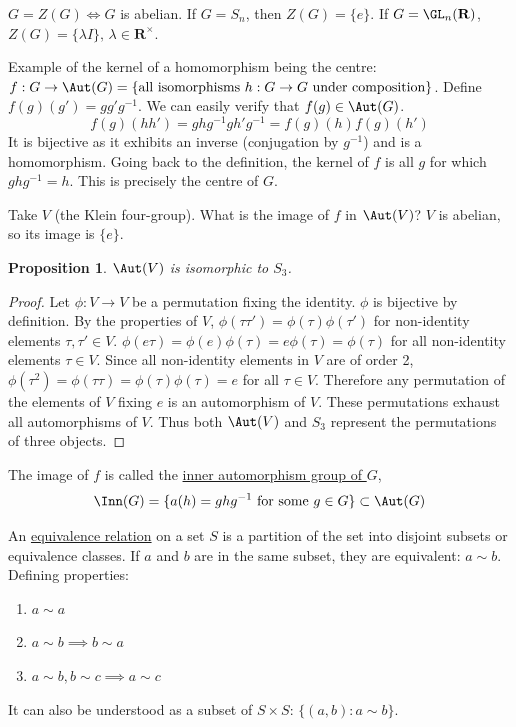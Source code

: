 \documentclass[11pt, oneside]{amsart}
\numberwithin{equation}{section}
\numberwithin{theorem}{section}
\newtheorem{proposition}[theorem]{Proposition}
\theoremstyle{definition}
\def\R{\mathbf{R}}
\begin{document}
$G = Z(G) \iff G$ is abelian. If $G=S_n$, then $Z(G) = \{e\}$. If $G = \GL_n(\R)$, $Z(G) = \{\lambda I \},\, \lambda\in\R^\times$.


Example of the kernel of a homomorphism being the centre: $f: G\to \Aut(G) = \{\textrm{all isomorphisms } h : G\to G \textrm{ under composition}\}$. Define $f(g)(g') = gg'g^{-1}$. We can easily verify that $f(g)\in\Aut(G)$. $$f(g)(hh') = ghg^{-1} gh'g^{-1} = f(g)(h) f(g)(h')$$ It is bijective as it exhibits an inverse (conjugation by $g^{-1}$) and is a homomorphism. Going back to the definition, the kernel of $f$ is all $g$ for which $ghg^{-1} = h$. This is precisely the centre of $G$.

Take $V$ (the Klein four-group). What is the image of $f$ in $\Aut(V)$? $V$ is abelian, so its image is $\{e\}$. 
\begin{proposition} { $\Aut(V)$ {is isomorphic to $S_3$. }} \end{proposition}

\begin{proof}
Let $\phi : V\to V$ be a permutation fixing the identity. $\phi$ is bijective by definition. By the properties of $V$, $\phi(\tau\tau') = \phi(\tau)\phi(\tau')$ for non-identity elements $\tau,\tau' \in V$. $\phi(e\tau) = \phi(e)\phi(\tau) = e\phi(\tau) = \phi(\tau)$ for all non-identity elements $\tau\in V$. Since all non-identity elements in $V$ are of order 2, $\phi(\tau^2) = \phi(\tau\tau)= \phi(\tau)\phi(\tau) = e$ for all $\tau\in V$. Therefore any permutation of the elements of $V$ fixing $e$ is an automorphism of $V$. These permutations exhaust all automorphisms of $V$. Thus both $\Aut(V)$ and $S_3$ represent the permutations of three objects.
\end{proof}

The image of $f$ is called the \underline{inner automorphism group of $G$}, $$
\Inn(G) = \{a(h) = ghg^{-1} \textrm{ for some } g \in G\}  \subset \Aut(G)
$$


An \underline{equivalence relation} on a set $S$ is a partition of the set into disjoint subsets or equivalence classes. If $a$ and $b$ are in the same subset, they are equivalent: $a\sim b$. Defining properties:
\begin{enumerate}[label=(\roman*)]
\item $a\sim a$
\item $a\sim b \implies b\sim a$
\item $a\sim b, b\sim c \implies a\sim c$
\end{enumerate}
It can also be understood as a  subset of $S\times S$: $\{(a,b) : a\sim b\}$. 
\end{document}
